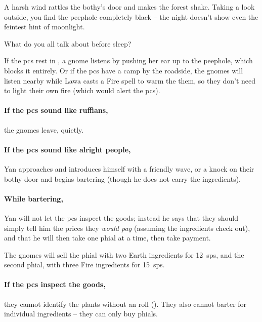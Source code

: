 \begin{boxtext}
	A harsh wind rattles the \gls{bothy}'s door and makes the forest shake.
	Taking a look outside, you find the peephole completely black -- the night doesn't show even the feintest hint of moonlight.

	What do you all talk about before sleep?
\end{boxtext}

If the \glspl{pc} rest in , a gnome listens by pushing her ear up to the peephole, which blocks it entirely.
Or if the \glspl{pc} have a camp by the roadside, the gnomes will listen nearby while Lawa casts a Fire spell to warm the them, so they don't need to light their own fire (which would alert the \glspl{pc}).

\paragraph{If the \glspl{pc} sound like ruffians,}
the gnomes leave, quietly.

\paragraph{If the \glspl{pc} sound like alright people,}
Yan approaches and introduces himself with a friendly wave, or a knock on their \gls{bothy} door and begins bartering (though he does not carry the \glspl{ingredient}).

\paragraph{While bartering,}
Yan will not let the \glspl{pc} inspect the goods; instead he says that they should simply tell him the prices they \textit{would pay} (assuming the \glspl{ingredient} check out), and that he will then take one phial at a time, then take payment.

The gnomes will sell the phial with two Earth \glspl{ingredient} for 12~\glspl{sp}, and the second phial, with three Fire \glspl{ingredient} for 15~\glspl{sp}.

\paragraph{If the \glspl{pc} inspect the goods,}
they cannot identify the plants without an  roll (\tn[12]).
They also cannot barter for individual \glspl{ingredient} -- they can only buy phials.







